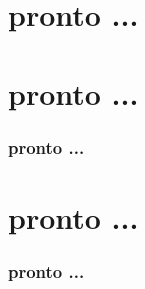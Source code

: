 \documentclass{beamer}
\begin{document}
\section{pronto ...}

\begin{frame}
\end{frame}

\section{pronto ...}
\begin{frame}
\frametitle{pronto ...}

\end{frame}

\section{pronto ...}
\begin{frame}
\frametitle{pronto ...}

\end{frame}
\end{document}
